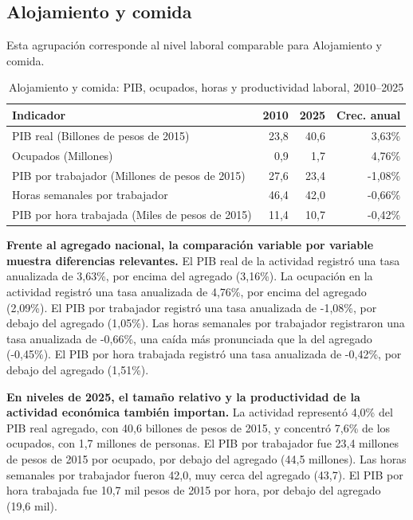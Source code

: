 \subsection{Alojamiento y comida}

Esta agrupación corresponde al nivel laboral comparable para Alojamiento y comida.

\begin{table}[H]
\centering
\caption{Alojamiento y comida: PIB, ocupados, horas y productividad laboral, 2010--2025}
\label{tab:agg25_i_productividad}
\small
\begin{tabular}{lrrr}
\toprule
Indicador & 2010 & 2025 & Crec. anual \\
\midrule
PIB real  (Billones de pesos de 2015) & 23,8 & 40,6 & 3,63\% \\
Ocupados (Millones) & 0,9 & 1,7 & 4,76\% \\
PIB por trabajador (Millones de pesos de 2015) & 27,6 & 23,4 & -1,08\% \\
Horas semanales por trabajador & 46,4 & 42,0 & -0,66\% \\
PIB por hora trabajada (Miles de pesos de 2015) & 11,4 & 10,7 & -0,42\% \\
\bottomrule
\end{tabular}
\end{table}

\textbf{Frente al agregado nacional, la comparación variable por variable muestra diferencias relevantes.} El PIB real de la actividad registró una tasa anualizada de 3,63\%, por encima del agregado (3,16\%). La ocupación en la actividad registró una tasa anualizada de 4,76\%, por encima del agregado (2,09\%). El PIB por trabajador registró una tasa anualizada de -1,08\%, por debajo del agregado (1,05\%). Las horas semanales por trabajador registraron una tasa anualizada de -0,66\%, una caída más pronunciada que la del agregado (-0,45\%). El PIB por hora trabajada registró una tasa anualizada de -0,42\%, por debajo del agregado (1,51\%).

\textbf{En niveles de 2025, el tamaño relativo y la productividad de la actividad económica también importan.} La actividad representó 4,0\% del PIB real agregado, con 40,6 billones de pesos de 2015, y concentró 7,6\% de los ocupados, con 1,7 millones de personas. El PIB por trabajador fue 23,4 millones de pesos de 2015 por ocupado, por debajo del agregado (44,5 millones). Las horas semanales por trabajador fueron 42,0, muy cerca del agregado (43,7). El PIB por hora trabajada fue 10,7 mil pesos de 2015 por hora, por debajo del agregado (19,6 mil).

